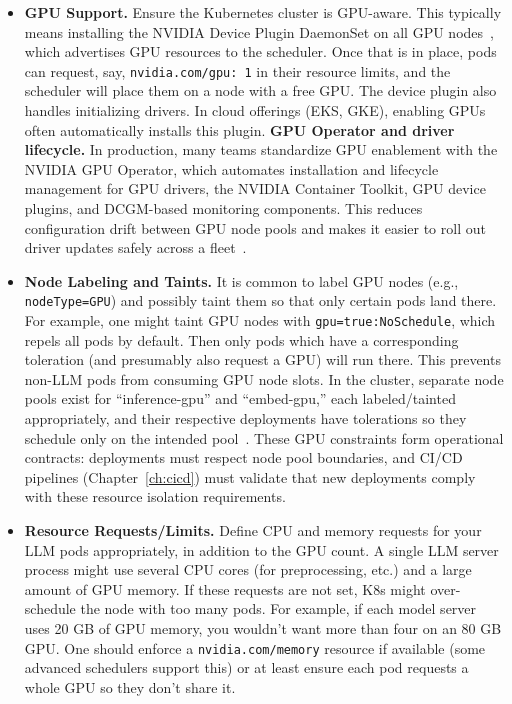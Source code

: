 \begin{itemize}
  \item \textbf{GPU Support.}  
  Ensure the Kubernetes cluster is GPU-aware. This typically means installing the NVIDIA Device Plugin DaemonSet on all GPU nodes~\cite{nvidia-k8s-device-plugin}, which advertises GPU resources to the scheduler. Once that is in place, pods can request, say, \texttt{nvidia.com/gpu: 1} in their resource limits, and the scheduler will place them on a node with a free GPU. The device plugin also handles initializing drivers. In cloud offerings (EKS, GKE), enabling GPUs often automatically installs this plugin.
  \textbf{GPU Operator and driver lifecycle.}
  In production, many teams standardize GPU enablement with the NVIDIA GPU Operator, which automates installation and lifecycle management for GPU drivers, the NVIDIA Container Toolkit, GPU device plugins, and DCGM-based monitoring components.
  This reduces configuration drift between GPU node pools and makes it easier to roll out driver updates safely across a fleet~\cite{nvidia_gpu_operator_docs,gke_gpu_operator_guide}.


  \item \textbf{Node Labeling and Taints.}  
  It is common to label GPU nodes (e.g., \texttt{nodeType=GPU}) and possibly taint them so that only certain pods land there. For example, one might taint GPU nodes with \texttt{gpu=true:NoSchedule}, which repels all pods by default. Then only pods which have a corresponding toleration (and presumably also request a GPU) will run there. This prevents non-LLM pods from consuming GPU node slots. In the \ishtar{} cluster, separate node pools exist for ``inference-gpu'' and ``embed-gpu,'' each labeled/tainted appropriately, and their respective deployments have tolerations so they schedule only on the intended pool~\cite{nvidia-k8s-device-plugin}. These GPU constraints form operational contracts: deployments must respect node pool boundaries, and CI/CD pipelines (Chapter~\ref{ch:cicd}) must validate that new deployments comply with these resource isolation requirements.

  \item \textbf{Resource Requests/Limits.}  
  Define CPU and memory requests for your LLM pods appropriately, in addition to the GPU count. A single LLM server process might use several CPU cores (for preprocessing, etc.) and a large amount of GPU memory. If these requests are not set, K8s might over-schedule the node with too many pods. For example, if each model server uses 20 GB of GPU memory, you wouldn’t want more than four on an 80 GB GPU. One should enforce a \texttt{nvidia.com/memory} resource if available (some advanced schedulers support this) or at least ensure each pod requests a whole GPU so they don’t share it.


\end{itemize}
